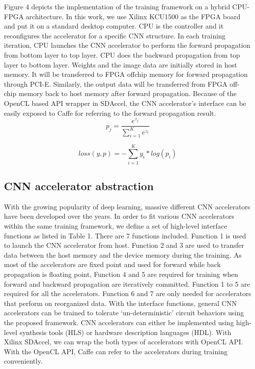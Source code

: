 Figure 4 depicts the implementation of the training framework on a hybrid 
CPU-FPGA architecture. In this work, we use Xilinx KCU1500 as the FPGA board 
and put it on a standard desktop computer. CPU is the controller and it reconfigures 
the accelerator for a specific CNN structure. In each training iteration, CPU launches 
the CNN accelerator to perform the forward propagation from bottom layer to top layer. 
CPU does the backward propagation from top layer to bottom layer. Weights and the image 
data are initially stored in host memory. It will be transferred to FPGA offchip memory 
for forward propagation through PCI-E. Similarly, the output data will be transferred 
from FPGA off-chip memory back to host memory after forward propagation. Because of the 
OpenCL based API wrapper in SDAccel, the CNN accelerator’s interface can be easily 
exposed to Caffe for referring to the forward propagation result. 
\begin{equation}
p_j=\frac{e^{z_j}}{\sum_{i=1}^{K}e^{z_i}}
\end{equation}

\begin{equation}
loss(y,p)=-\sum_{i=1}^{K}y_i*log(p_i)
\end{equation}

\subsection{CNN accelerator abstraction}
  With the growing popularity of deep learning, massive different 
CNN accelerators have been developed over the years. In order to fit various CNN accelerators 
within the same training framework, we define a set of high-level interface functions as listed 
in Table 1. There are 7 functions included. Function 1 is used to launch the CNN accelerator from host. 
Function 2 and 3 are used to transfer data between the host memory and the device memory during 
the training. As most of the accelerators are fixed point and used for forward while back propagation 
is floating point, Function 4 and 5 are required for training when forward and backward 
propagation are iteratively committed. Function 1 to 5 are required for all the accelerators. 
Function 6 and 7 are only needed for accelerators that perform on reorganized data\cite{pipecnn_2,deepburing_12}. 
With the interface functions, general CNN accelerators can be trained to tolerate ‘un-deterministic’ circuit 
behaviors using the proposed framework.
  CNN accelerators can either be implemented using high-level synthesis tools (HLS) or hardware description 
languages (HDL). With Xilinx SDAccel, we can wrap the both types of accelerators with OpenCL API. 
With the OpenCL API, Caffe can refer to the accelerators during training conveniently. 

